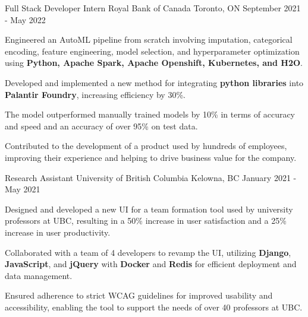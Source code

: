 \begin{cventries}
	\cventry
	{Full Stack Developer Intern } %
	{Royal Bank of Canada } %
	{Toronto, ON } %
	{September 2021 - May 2022} %
	{
		\begin{cvitems} %
			\item {Engineered an AutoML pipeline from scratch involving imputation, categorical encoding, feature engineering, model selection, and hyperparameter optimization using \textbf{Python, Apache Spark, Apache Openshift, Kubernetes, and H2O}.} 
      \item {Developed and implemented a new method for integrating \textbf{python libraries} into \textbf{Palantir Foundry}, increasing efficiency by 30\%.}
      \item {The model outperformed manually trained models by 10\% in terms of accuracy and speed and an accuracy of over 95\% on test data.}
      \item {Contributed to the development of a product used by hundreds of employees, improving their experience and helping to drive business value for the company.}
		\end{cvitems}
	}



	\cventry
	{Research Assistant } %
	{University of British Columbia } %
	{Kelowna, BC } %
	{January 2021 - May 2021} %
	{
		\begin{cvitems} %
    \item {Designed and developed a new UI for a team formation tool used by university professors at UBC, resulting in a 50\% increase in user satisfaction and a 25\% increase in user productivity.}
    \item {Collaborated with a team of 4 developers to revamp the UI, utilizing \textbf{Django}, \textbf{JavaScript}, and \textbf{jQuery} with \textbf{Docker} and \textbf{Redis} for efficient deployment and data management.}
    \item {Ensured adherence to strict WCAG guidelines for improved usability and accessibility, enabling the tool to support the needs of over 40 professors at UBC.}
		\end{cvitems}
	}




\end{cventries}
